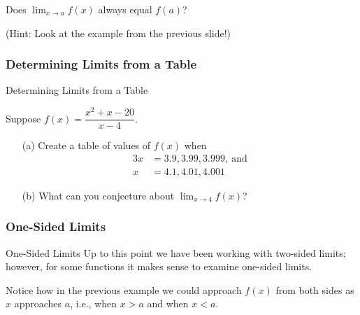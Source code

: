 \documentclass[cal1spr16Lectures.tex]{subfiles}
\begin{document}
\begin{frame}
\begin{que} Does $\lim_{x \to a} f(x)$ always equal $f(a)$? \end{que}
(Hint: Look at the example from the previous slide!)
\end{frame}

\subsubsection{Determining Limits from a Table}
\begin{frame}{\small Determining Limits from a Table}
\begin{exe} Suppose $f(x)=\dfrac{x^2+x-20}{x-4}$.

\begin{itemize}
\item[(a)] Create a table of values of $f(x)$ when
\begin{alignat*}{3}
x &= 3.9, 3.99, 3.999,\ \text{and}\\
x &= 4.1, 4.01, 4.001
\end{alignat*}
\item[(b)] What can you conjecture about $\lim_{x \to 4} f(x)$?
\end{itemize}
\end{exe}
\end{frame}

\subsubsection{One-Sided Limits}
\begin{frame}{\small One-Sided Limits}
Up to this point we have been working with two-sided limits; however, for some functions it makes sense to examine one-sided limits.  

\vspace{2pc}
Notice how in the previous example we could approach $f(x)$ from both sides as $x$ approaches $a$, i.e., when $x>a$ and when $x<a$.  
\end{frame} 
\end{document}
